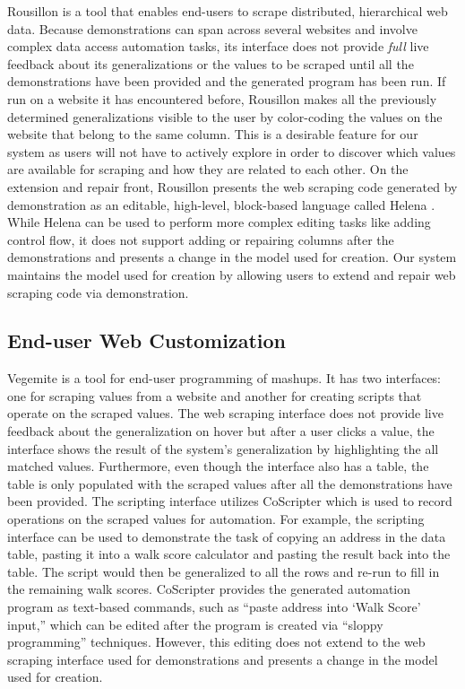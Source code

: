 \documentclass[sigconf,10pt]{acmart}
\begin{document}
Rousillon \citep{chasins2018} is a tool that enables end-users to scrape
distributed, hierarchical web data. Because demonstrations can span
across several websites and involve complex data access automation
tasks, its interface does not provide \emph{full} live feedback about
its generalizations or the values to be scraped until all the
demonstrations have been provided and the generated program has been
run. If run on a website it has encountered before, Rousillon makes all
the previously determined generalizations visible to the user by
color-coding the values on the website that belong to the same column.
This is a desirable feature for our system as users will not have to
actively explore in order to discover which values are available for
scraping and how they are related to each other. On the extension and
repair front, Rousillon presents the web scraping code generated by
demonstration as an editable, high-level, block-based language called
Helena \citep{zotero-1349}. While Helena can be used to perform more
complex editing tasks like adding control flow, it does not support
adding or repairing columns after the demonstrations and presents a
change in the model used for creation. Our system maintains the model
used for creation by allowing users to extend and repair web scraping
code via demonstration.

\hypertarget{end-user-web-customization}{%
\subsection{End-user Web
Customization}\label{end-user-web-customization}}

Vegemite \citep{lin2009} is a tool for end-user programming of mashups.
It has two interfaces: one for scraping values from a website and
another for creating scripts that operate on the scraped values. The web
scraping interface does not provide live feedback about the
generalization on hover but after a user clicks a value, the interface
shows the result of the system's generalization by highlighting the all
matched values. Furthermore, even though the interface also has a table,
the table is only populated with the scraped values after all the
demonstrations have been provided. The scripting interface utilizes
CoScripter \citep{leshed2008} which is used to record operations on the
scraped values for automation. For example, the scripting interface can
be used to demonstrate the task of copying an address in the data table,
pasting it into a walk score calculator and pasting the result back into
the table. The script would then be generalized to all the rows and
re-run to fill in the remaining walk scores. CoScripter provides the
generated automation program as text-based commands, such as ``paste
address into `Walk Score' input,'' which can be edited after the program
is created via ``sloppy programming'' \citep{lin2009} techniques.
However, this editing does not extend to the web scraping interface used
for demonstrations and presents a change in the model used for creation.
\end{document}
